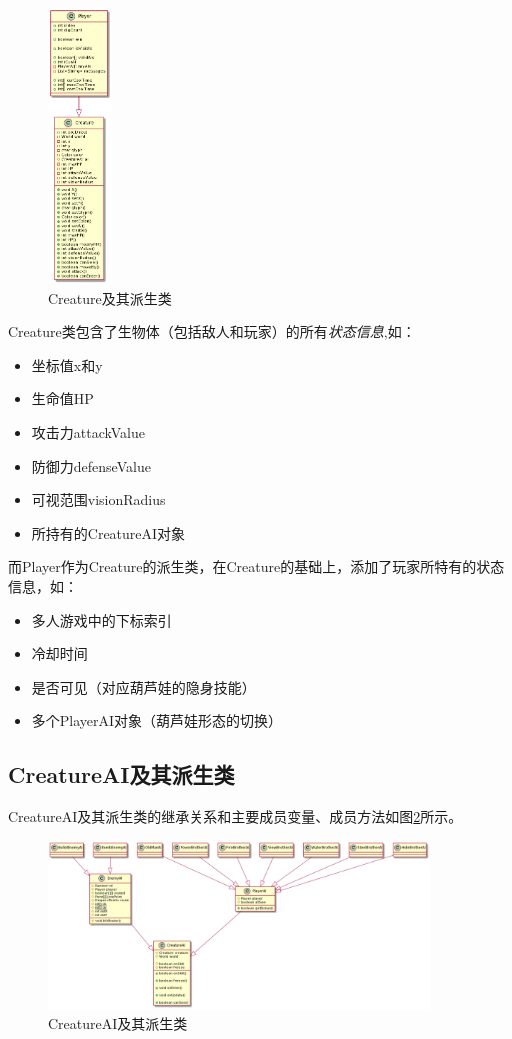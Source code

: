 \documentclass{SCIS2022cn}
\begin{document}
\begin{figure}[!t]
\centering
\includegraphics*[width=0.15\textwidth]{pics/creature.png}
\caption{Creature及其派生类}
\label{fig3}
\end{figure}

Creature类包含了生物体（包括敌人和玩家）的所有\emph{状态信息},如：
\begin{itemize}
    \item 坐标值x和y
    \item 生命值HP
    \item 攻击力attackValue
    \item 防御力defenseValue
    \item 可视范围visionRadius
    \item 所持有的CreatureAI对象
\end{itemize}

而Player作为Creature的派生类，在Creature的基础上，添加了玩家所特有的状态信息，如：
\begin{itemize}
    \item 多人游戏中的下标索引
    \item 冷却时间
    \item 是否可见（对应葫芦娃的隐身技能）
    \item 多个PlayerAI对象（葫芦娃形态的切换）
\end{itemize}

\subsection{CreatureAI及其派生类}

CreatureAI及其派生类的继承关系和主要成员变量、成员方法如图\ref{fig4}所示。

\begin{figure}[!t]
\centering
\includegraphics*[width=0.9\textwidth]{pics/creatureAI.png}
\caption{CreatureAI及其派生类}
\label{fig4}
\end{figure}
\end{document}

